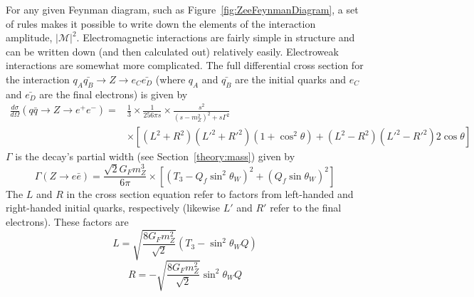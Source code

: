 
For any given Feynman diagram, 
such as Figure~\ref{fig:ZeeFeynmanDiagram}, 
a set of rules makes it possible to write 
down the elements of the interaction amplitude, 
$\left| \mathcal{M} \right| ^2$.  
Electromagnetic interactions are fairly 
simple in structure and can be written down 
(and then calculated out) relatively easily.  
Electroweak interactions are somewhat 
more complicated.  
The full differential cross section for the interaction 
$ q_A \bar{q_B} \rightarrow Z \rightarrow e_{C} \bar{e_{D}} $
(where $q_A$ and $\bar{q_B}$ are the initial quarks 
and $e_{C}$ and $\bar{e_{D}}$ are the final electrons) is given by 
\begin{align*}
\frac{d \sigma}{d \Omega} 
( q \bar{q} \rightarrow Z \rightarrow e^+ e^- ) 
= &\frac{1}{3} 
\times \frac{1}{256 \pi s} 
\times \frac{s^2}{(s - m_Z^2)^2 + s \Gamma^2} \\
&\times \left[(L^2 + R^2) (L'^2 + R'^2) (1 + \cos^2 \theta)
+ (L^2 - R^2) (L'^2 - R'^2) 2 \cos \theta \right]
\end{align*}
$\Gamma$ is the \Zee decay's 
partial width (see Section~\ref{theory:mass}) 
given by 
\[
\Gamma (Z \rightarrow e \bar{e} )
= \frac{ \sqrt{2} G_F m_Z^3 }{6 \pi}
\times \left[(T_3 - Q_f \sin^2 \theta_W )^2 
+ (Q_f \sin \theta_W )^2 \right]
\]
The $L$ and $R$ in the cross section equation 
refer to factors from %
left-handed and right-handed initial quarks, respectively 
(likewise $L'$ and $R'$ refer to the final electrons).  
These factors are 
\[
L = \sqrt{ \frac{8 G_F m_Z^2}{\sqrt{2} } }(T_3 - \sin^2 \theta_W Q)
\]
\[
R = - \sqrt{ \frac{8 G_F m_Z^2}{\sqrt{2} } } \sin^2 \theta_W Q
\]
